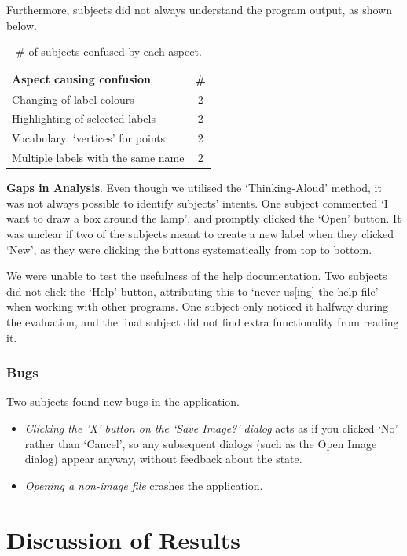 \documentclass[11pt,twocolumn]{article}
\begin{document}
Furthermore, subjects did not always understand the program output, as shown below.

\begin{table}[h!]
\centering
\begin{tabular}{|l|c|}
\hline
{\bf Aspect causing confusion} & {\bf \#} \\
\hline
Changing of label colours & 2 \\
Highlighting of selected labels & 2 \\
Vocabulary: `vertices' for points & 2 \\
Multiple labels with the same name & 2 \\
\hline
\end{tabular}
\caption{\# of subjects confused by each aspect.}
\label{confusion}
\end{table}

{\bf Gaps in Analysis}. Even though we utilised the `Thinking-Aloud' method, it was not always possible to identify subjects’ intents. One subject commented `I want to draw a box around the lamp', and promptly clicked the `Open' button. It was unclear if two
of the subjects meant to create a new label when they clicked `New', as they were clicking the buttons systematically from top to bottom.

We were unable to test the usefulness of the help documentation. Two subjects did not click the `Help' button, attributing this to `never us[ing] the help file' when working with other programs. One subject only noticed it halfway during the evaluation, and the final subject did not find extra functionality from reading it.

\subsubsection{Bugs}

Two subjects found new bugs in the application. 
\begin{itemize}
\item \emph{Clicking the 'X' button on the `Save Image?' dialog} acts as if you clicked `No' rather than `Cancel', so any subsequent dialogs (such as the Open Image dialog) appear
anyway, without feedback about the state. 
\item \emph{ Opening a non-image file }crashes the application.
\end{itemize}

\section{Discussion of Results}
\end{document}
